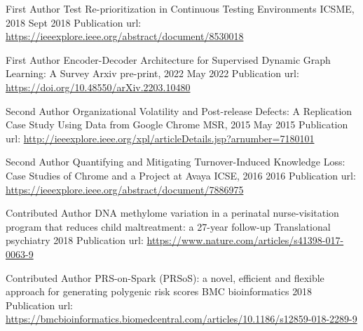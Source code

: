 \documentclass[11pt, a4paper]{awesome-cv} %
\begin{document}
\begin{cventries}
	
	\cventry
	{First Author} %
	{Test Re-prioritization in Continuous Testing Environments} %
	{ICSME, 2018} %
	{Sept 2018} %
	{Publication url: \url{https://ieeexplore.ieee.org/abstract/document/8530018}
	}
	
	
	\cventry
	{First Author} %
	{Encoder-Decoder Architecture for Supervised Dynamic Graph Learning: A Survey} %
	{Arxiv pre-print, 2022} %
	{May 2022} %
	{Publication url: \url{https://doi.org/10.48550/arXiv.2203.10480}
	}
	
	
	\cventry
	{Second Author} %
	{Organizational Volatility and Post-release Defects: A Replication Case Study Using Data from Google Chrome} %
	{MSR, 2015 } %
	{May 2015} %
    {Publication url: \url{http://ieeexplore.ieee.org/xpl/articleDetails.jsp?arnumber=7180101}
    }
	
	
	
	\cventry
	{Second Author} %
	{Quantifying and Mitigating Turnover-Induced Knowledge Loss: Case Studies of Chrome and a Project at Avaya} %
	{ICSE, 2016} %
	{2016} %
    {Publication url: \url{https://ieeexplore.ieee.org/abstract/document/7886975}
}

	
	
		\cventry
	{Contributed Author} %
	{DNA methylome variation in a perinatal nurse-visitation program that reduces child maltreatment: a 27-year follow-up} %
	{Translational psychiatry} %
	{2018} %
    {Publication url: \url{https://www.nature.com/articles/s41398-017-0063-9}
}

	
	
	\cventry
	{Contributed Author} %
	{PRS-on-Spark (PRSoS): a novel, efficient and flexible approach for generating polygenic risk scores} %
	{BMC bioinformatics} %
	{2018} %
	    {Publication url: \url{https://bmcbioinformatics.biomedcentral.com/articles/10.1186/s12859-018-2289-9}
	}
	
	
\end{cventries}
%
\end{document}

